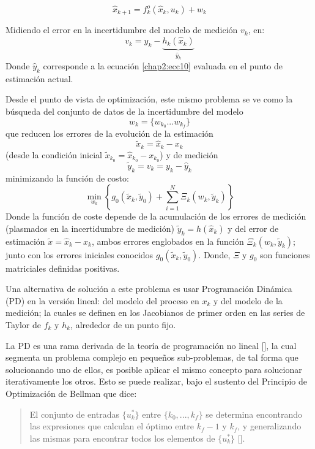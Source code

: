 \documentclass[10pt]{report}
\numberwithin{equation}{chapter}
\numberwithin{algorithm}{chapter}
\begin{document}
\begin{equation}
\label{chap2:ecc11}
\hat{x}_{k+1}=f^o_k(\hat{x}_k,u_k)+w_k
\end{equation}
\par
Midiendo el error en la incertidumbre del modelo de medición $v_k$, en:
\begin{equation}
\label{chap2:ecc4}
v_k=y_k-\underbrace{h_k(\hat{x}_k)}_{\hat{y}_k}
\end{equation}
Donde $\hat{y}_k$ corresponde a la ecuación \ref{chap2:ecc10} evaluada en el punto de estimación actual.\par
Desde el punto de vista de optimización, este mismo problema se ve como la búsqueda del conjunto de datos de la incertidumbre del modelo $$w_k=\{w_{k_0}...w_{k_f}\}$$ que reducen los errores de la evolución de la estimación $$\tilde{x}_k=\hat{x}_k-x_k$$ (desde la condición inicial $\tilde{x}_{k_0}=\hat{x}_{k_0}-x_{k_0}$) y de medición $$\tilde{y}_k=v_k=y_k-\hat{y}_k$$ minimizando la función de costo:
\begin{equation}\label{recons_ecc1}\min_{w_k}\left\{g_0(\tilde{x}_k,\tilde{y}_0)+ \sum_{i=1}^{N}\Xi_k(w_k,\tilde{y}_k) \right\}\end{equation}
Donde la función de coste depende de la acumulación de los errores de medición (plasmados en la incertidumbre de medición) $\tilde{y}_k=h(\hat{x}_k)$ y del error de estimación $\tilde{x}=\hat{x}_k-x_k$, ambos errores englobados en la función $\Xi_k(w_k,\tilde{y}_k)$; junto con los errores iniciales conocidos $g_0(\tilde{x}_k,\tilde{y}_0)$. Donde, $\Xi$ y $g_0$ son funciones matriciales definidas positivas.\par
Una alternativa de solución a este problema es usar Programación Dinámica (PD) en la versión lineal: del modelo del proceso en $x_k$ y del modelo de la medición; la cuales se definen en los Jacobianos de primer orden en las series de Taylor de $f_k$ y $h_k$, alrededor de un punto fijo.\par
La PD es una rama derivada de la teoría de programación no lineal [\cite{Avriel2003}], la cual segmenta un problema complejo en pequeños sub-problemas, de tal forma que solucionando uno de ellos, es posible aplicar el mismo concepto para solucionar iterativamente los otros. Esto se puede realizar, bajo el sustento del Principio de Optimización de Bellman que dice:
\begin{quote}
El conjunto de entradas $\{u^*_k\}$ entre $\{k_0,...,k_f\}$ se determina encontrando las expresiones que calculan el óptimo entre $k_f-1$ y $k_f$, y generalizando las mismas para encontrar todos los elementos de $\{u^*_k\}$ [\cite{Lewis2012}].
\end{quote} 
\end{document}
